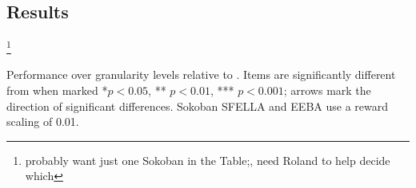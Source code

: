 \subsection{Results}
\footnote{probably want just one Sokoban in the Table;, need Roland to help decide which}


\begin{table}[t]
\footnotesize
  \caption{Performance over granularity levels relative to \tloA{}. Items are significantly different from \tloA{} when marked *$p<0.05$, ** $p <0.01$, *** $p<0.001$; arrows mark the direction of significant differences. Sokoban SFELLA and EEBA use a reward scaling of 0.01.}
  \label{tab:granularity_significance}
\begin{adjustbox}{width=\columnwidth}

\end{adjustbox}
\end{table}


